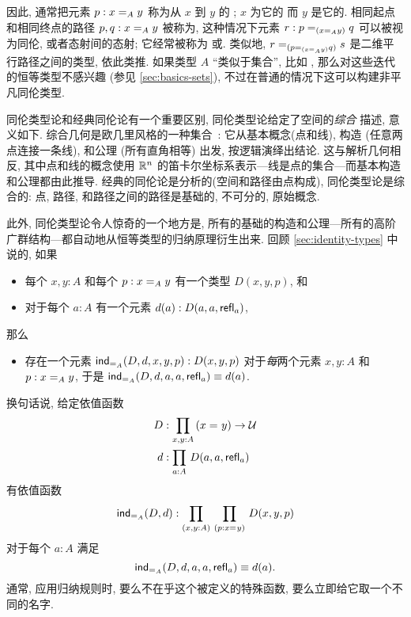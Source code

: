 因此, 通常把元素 $p : \id[A]{x}{y}$ 称为从 $x$ 到 $y$ 的 ;
%
$x$ 为它的%
%
%
而 $y$ 是它的.
%
%
相同起点和相同终点的路径 $p,q : \id[A]{x}{y}$ 被称为,
%
%
这种情况下元素 $r : \id[{(\id[A]{x}{y})}]{p}{q}$ 可以被视为同伦, 或者态射间的态射;
它经常被称为%
%
%
或.
%
%
%
类似地, $\id[{(\id[{(\id[A]{x}{y})}]{p}{q})}]{r}{s}$ 是二维平行路径之间的类型,
%
依此类推.
如果类型 $A$ ``类似于集合'', 比如 \nat, 那么对这些迭代的恒等类型不感兴趣 (参见 \cref{sec:basics-sets}), 不过在普通的情况下这可以构建非平凡同伦类型.


同伦类型论和经典同伦论有一个重要区别, 同伦类型论给定了空间的\emph{综合}%
%
%
%
描述, 意义如下.
综合几何是欧几里风格的一种集合~\cite{Euclid}: 它从基本概念(点和线), 构造 (任意两点连接一条线), 和公理 (所有直角相等) 出发, 按逻辑演绎出结论.
这与解析几何相反,
%
其中点和线的概念使用 $\R^n$ 的笛卡尔坐标系表示---线是点的集合---而基本构造和公理都由此推导.
经典的同伦论是分析的(空间和路径由点构成), 同伦类型论是综合的: 点, 路径, 和路径之间的路径是基础的, 不可分的, 原始概念.

此外, 同伦类型论令人惊奇的一个地方是, 所有的基础的构造和公理---所有的高阶广群结构---都自动地从恒等类型的归纳原理衍生出来.
回顾 \cref{sec:identity-types} 中说的, 如果
\begin{itemize}
    \item 每个 $x,y:A$ 和每个 $p:\id[A]xy$ 有一个类型 $D(x,y,p)$, 和
    \item 对于每个 $a:A$ 有一个元素 $d(a):D(a,a,\refl a)$,
\end{itemize}
那么
\begin{itemize}
    \item 存在一个元素 $\indid{A}(D,d,x,y,p):D(x,y,p)$ 对于\emph{每}两个元素 $x,y:A$ 和 $p:\id[A]xy$, 于是 $\indid{A}(D,d,a,a,\refl a) \jdeq d(a)$.
\end{itemize}
换句话说, 给定依值函数
\begin{align*}
    D &:\prd{x,y:A} (\id{x}{y}) \to \type\\
    d &:\prd{a:A} D(a,a,\refl{a})
\end{align*}
有依值函数
\[
    \indid{A}(D,d):\prd{x,y:A}{p:\id{x}{y}} D(x,y,p)
\]
对于每个 $a:A$ 满足
\begin{equation}
    \label{eq:Jconv}
    \indid{A}(D,d,a,a,\refl{a})\jdeq d(a).
\end{equation}
通常, 应用归纳规则时, 要么不在乎这个被定义的特殊函数, 要么立即给它取一个不同的名字.

